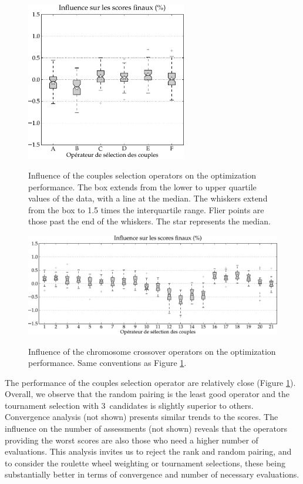 \documentclass[twocol]{ametsoc}
\begin{document}
\begin{figure}[htb]
	\begin{center}
		\noindent\includegraphics[width=7cm,angle=0]{figures/operator_selectcoupl_score.pdf}\\
	\end{center}
	\caption{Influence of the couples selection operators on the optimization performance. The box extends from the lower to upper quartile values of the data, with a line at the median. The whiskers extend from the box to 1.5 times the interquartile range. Flier points are those past the end of the whiskers. The star represents the median.}
	\label{fig:operator_selectcoupl_score}
\end{figure}


\begin{figure}[htb]
	\begin{center}
		\noindent\includegraphics[width=16cm,angle=0]{figures/operator_crossover_score.pdf}\\
	\end{center}
	\caption{Influence of the chromosome crossover operators on the optimization performance. Same conventions as Figure \ref{fig:operator_selectcoupl_score}.}
	\label{fig:operator_crossover_score}
\end{figure}

The performance of the couples selection operator are relatively close (Figure \ref{fig:operator_selectcoupl_score}). Overall, we observe that the random pairing is the least good operator and the tournament selection with 3~candidates is slightly superior to others. Convergence analysis (not shown) presents similar trends to the scores. The influence on the number of assessments (not shown) reveals that the operators providing the worst scores are also those who need a higher number of evaluations. This analysis invites us to reject the rank and random pairing, and to consider the roulette wheel weighting or tournament selections, these being substantially better in terms of convergence and number of necessary evaluations.
\end{document}
